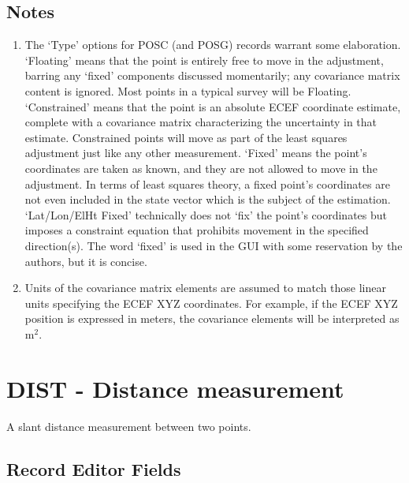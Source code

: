 \subsection*{Notes}
\begin{enumerate}
\item The `Type' options for POSC (and POSG) records warrant some elaboration.  `Floating' means that the point is entirely free to move in the adjustment, barring any `fixed' components discussed momentarily; any covariance matrix content is ignored.  Most points in a typical survey will be Floating.  `Constrained' means that the point is an absolute ECEF coordinate estimate, complete with a covariance matrix characterizing the uncertainty in that estimate.  Constrained points will move as part of the least squares adjustment just like any other measurement.  `Fixed' means the point's coordinates are taken as known, and they are not allowed to move in the adjustment.  In terms of least squares theory, a fixed point's coordinates are not even included in the state vector which is the subject of the estimation.  `Lat/Lon/ElHt Fixed' technically does not `fix' the point's coordinates but imposes a constraint equation that prohibits movement in the specified direction(s).  The word `fixed' is used in the GUI with some reservation by the authors, but it is concise.
\item Units of the covariance matrix elements are assumed to match those linear units specifying the ECEF XYZ coordinates.  For example, if the ECEF XYZ position is expressed in meters, the covariance elements will be interpreted as $\mathrm{m}^2$.
\end{enumerate}


\newpage
\section{DIST - Distance measurement}

A slant distance measurement between two points.

\subsection*{Record Editor Fields}

